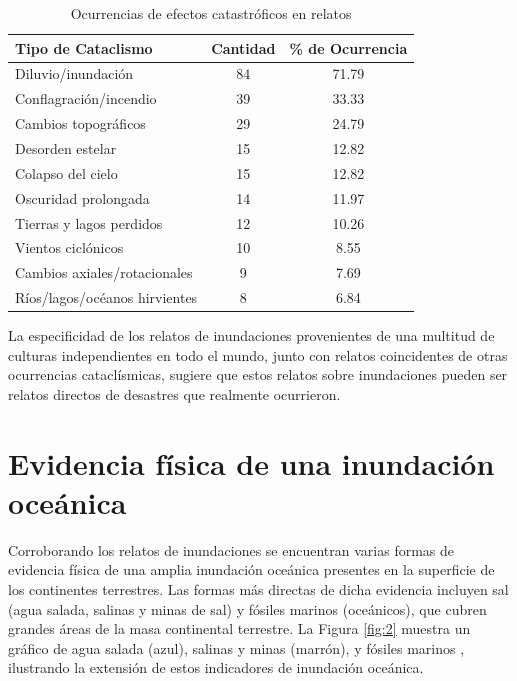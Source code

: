 \documentclass[10pt,twocolumn,letterpaper]{article}
\begin{document}
\begin{table}[ht]
\begin{center}
\renewcommand{\arraystretch}{1.2}  %
\begin{tabular}{|l|c|c|}
\hline
\textbf{Tipo de Cataclismo} & \textbf{Cantidad} & \textbf{\% de Ocurrencia} \\
\hline\hline
Diluvio/inundación            & 84 & 71.79 \\
Conflagración/incendio        & 39 & 33.33 \\
Cambios topográficos          & 29 & 24.79 \\
Desorden estelar              & 15 & 12.82 \\
Colapso del cielo             & 15 & 12.82 \\
Oscuridad prolongada          & 14 & 11.97 \\

Tierras y lagos perdidos    & 12 & 10.26 \\
Vientos ciclónicos          & 10 & 8.55  \\
Cambios axiales/rotacionales & 9 & 7.69  \\
Ríos/lagos/océanos hirvientes & 8 & 6.84 \\
\hline
\end{tabular}
\end{center}
\caption{Ocurrencias de efectos catastróficos en relatos}
\label{tab: 1}
\end{table}

La especificidad de los relatos de inundaciones provenientes de una multitud de culturas independientes en todo el mundo, junto con relatos coincidentes de otras ocurrencias cataclísmicas, sugiere que estos relatos sobre inundaciones pueden ser relatos directos de desastres que realmente ocurrieron.

\section{Evidencia física de una inundación oceánica}

Corroborando los relatos de inundaciones se encuentran varias formas de evidencia física de una amplia inundación oceánica presentes en la superficie de los continentes terrestres. Las formas más directas de dicha evidencia incluyen sal (agua salada, salinas y minas de sal) y fósiles marinos (oceánicos), que cubren grandes áreas de la masa continental terrestre. La Figura \ref{fig:2} muestra un gráfico de agua salada (azul), salinas y minas (marrón), y fósiles marinos \cite{15,16,86,87}, ilustrando la extensión de estos indicadores de inundación oceánica.
\end{document}
